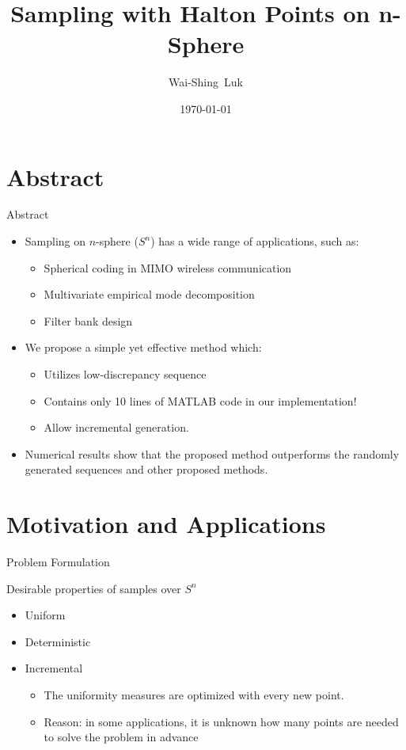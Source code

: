 \documentclass[10pt,ignorenonframetext,serif,onlymath]{beamer}
\title{Sampling with Halton Points on n-Sphere}
\author{Wai-Shing~Luk}
\institute{Fudan University}
\date{\today}
\begin{document}
\frame{\titlepage}

\hypertarget{abstract}{%
\section{Abstract}\label{abstract}}

\begin{frame}{Abstract}
\protect\hypertarget{abstract-1}{}

\begin{itemize}
\item
  Sampling on \(n\)-sphere (\(S^n\)) has a wide range of applications,
  such as:

  \begin{itemize}
  \item
    Spherical coding in MIMO wireless communication
  \item
    Multivariate empirical mode decomposition
  \item
    Filter bank design
  \end{itemize}
\item
  We propose a simple yet effective method which:

  \begin{itemize}
  \item
    Utilizes low-discrepancy sequence
  \item
    Contains only 10 lines of MATLAB code in our implementation!
  \item
    Allow incremental generation.
  \end{itemize}
\item
  Numerical results show that the proposed method outperforms the
  randomly generated sequences and other proposed methods.
\end{itemize}

\end{frame}

\hypertarget{motivation-and-applications}{%
\section{Motivation and
Applications}\label{motivation-and-applications}}

\begin{frame}{Problem Formulation}
\protect\hypertarget{problem-formulation}{}

Desirable properties of samples over \(S^n\)

\begin{itemize}
\item
  Uniform
\item
  Deterministic
\item
  Incremental

  \begin{itemize}
  \item
    The uniformity measures are optimized with every new point.
  \item
    Reason: in some applications, it is unknown how many points are
    needed to solve the problem in advance
  \end{itemize}
\end{itemize}

\end{frame}
\end{document}
